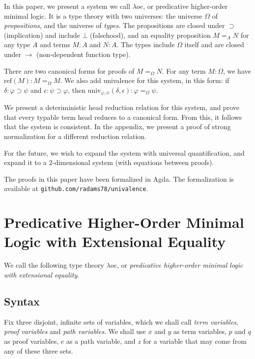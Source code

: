 \documentclass[a4paper,UKenglish]{lipics-v2016}
\newcommand*{\reff}[1]{\ensuremath{\mathrm{ref} \left( {#1} \right)}}
\newcommand*{\univ}[4]{\ensuremath{\mathrm{univ}_{{#1}, {#2}} \left({#3} , {#4} \right)}}
\theoremstyle{plain}
\begin{document}
In this paper, we present a system we call $\lambda o e$, or predicative higher-order minimal logic.  It is a type theory with two universes: the universe $\Omega$
of \emph{propositions}, and the universe of \emph{types}.  The propositions are closed under $\supset$ (implication) and include $\bot$ (falsehood), and an equality proposition $M =_A N$ for
any type $A$ and terms $M : A$ and $N : A$.  The types include $\Omega$ itself and are closed under $\rightarrow$ (non-dependent function type).

There are two canonical forms for proofs of $M =_\Omega N$.  For any term $M : \Omega$, we have $\reff{M} : M =_\Omega M$.  We also add univalence for this system, in this form:
if $\delta : \varphi \supset \psi$ and $\epsilon : \psi \supset\varphi$, then $\univ{\varphi}{\psi}{\delta}{\epsilon} : \varphi =_\Omega \psi$.  

We present a deteriministic head reduction relation for this system, and prove that every typable term head reduces to a canonical form.  From this, it follows that the system is consistent.  In the appendix, we present a proof of strong normalization for a different reduction relation.

For the future, we wish to expand the system with universal quantification, and expand it to a 2-dimensional system (with equations between proofs).

The proofs in this paper have been formalized in Agda.  The formalization is available at \texttt{github.com/radams78/univalence}.

\section{Predicative Higher-Order Minimal Logic with Extensional Equality}

We call the following type theory $\lambda o e$, or \emph{predicative higher-order minimal logic with extensional equality}.  

\subsection{Syntax}

Fix three disjoint, infinite sets of variables, which we shall call \emph{term variables}, \emph{proof variables}
and \emph{path variables}.  We shall use $x$ and $y$ as term variables, $p$ and $q$ as proof variables,
$e$ as a path variable, and $z$ for a variable that may come from any of these three sets.
\end{document}
